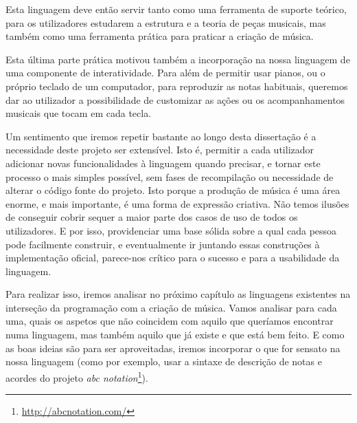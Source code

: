 Esta linguagem deve então servir tanto como uma ferramenta de suporte teórico, para os utilizadores estudarem a estrutura e a teoria de peças musicais, mas também como uma ferramenta prática para praticar a criação de música.

Esta última parte prática motivou também a incorporação na nossa linguagem de uma componente de interatividade. Para além de permitir usar pianos, ou o próprio teclado de um computador, para reproduzir as notas habituais, queremos dar ao utilizador a possibilidade de customizar as ações ou os acompanhamentos musicais que tocam em cada tecla.

Um sentimento que iremos repetir bastante ao longo desta dissertação é a necessidade deste projeto ser extensível. Isto é, permitir a cada utilizador adicionar novas funcionalidades à linguagem quando precisar, e tornar este processo o mais simples possível, sem fases de recompilação ou necessidade de alterar o código fonte do projeto. Isto porque a produção de música é uma área enorme, e mais importante, é uma forma de expressão criativa. Não temos ilusões de conseguir cobrir sequer a maior parte dos casos de uso de todos os utilizadores. E por isso, providenciar uma base sólida sobre a qual cada pessoa pode facilmente construir, e eventualmente ir juntando essas construções à implementação oficial, parece-nos crítico para o sucesso e para a usabilidade da linguagem.

Para realizar isso, iremos analisar no próximo capítulo as linguagens existentes na interseção da programação com a criação de música. Vamos analisar para cada uma, quais os aspetos que não coincidem com aquilo que queríamos encontrar numa linguagem, mas também aquilo que já existe e que está bem feito. E como as boas ideias são para ser aproveitadas, iremos incorporar o que for sensato na nossa linguagem (como por exemplo, usar a sintaxe de descrição de notas e acordes do projeto \textit{abc notation}\footnote{\url{http://abcnotation.com/}}).





